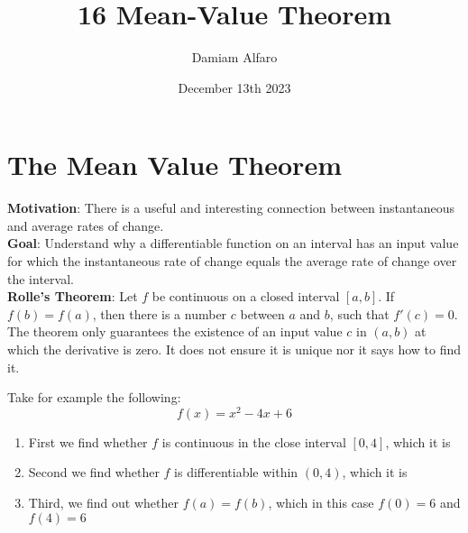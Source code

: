 \documentclass[12pt, letterpaper]{article}
\title{16 Mean-Value Theorem}
\author{Damiam Alfaro}
\date{December 13th 2023}
\begin{document}
\maketitle

\section{The Mean Value Theorem}
\textbf{Motivation}: There is a useful and interesting connection between instantaneous and average rates of change.\\
\newline
\textbf{Goal}: Understand why a differentiable function on an interval has an input value for which the instantaneous rate of change equals the average rate of change over the interval.\\
\newline
\textbf{Rolle's Theorem}: Let \(f\) be continuous on a closed interval \([a,b]\). If \(f(b) = f(a)\), then there is a number \(c\) between \(a\) and \(b\), such that \(f'(c)=0\). The theorem only guarantees the existence of an input value \(c\) in \((a,b)\) at which the derivative is zero. It does not ensure it is unique nor it says how to find it.
\begin{center}
\end{center}
Take for example the following:
\[f(x)=x^2-4x+6\]
\begin{enumerate}
    \item First we find whether \(f\) is continuous in the close interval \([0,4]\), which it is
    \item Second we find whether \(f\) is differentiable within \((0,4)\), which it is
    \item Third, we find out whether \(f(a) = f(b)\), which in this case \(f(0) = 6\) and \(f(4) = 6\)
\end{enumerate}
\end{document}

